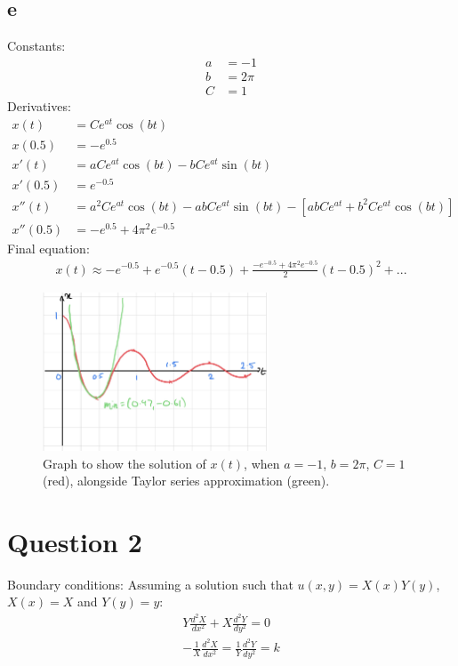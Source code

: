 \documentclass[11pt]{article}
\numberwithin{equation}{section}
\begin{document}
\subsection*{e}
Constants:
\begin{align}
  a &= - 1\\
  b &= 2\pi\\
  C &= 1
\end{align}
Derivatives:
\begin{align}
  x(t) &= Ce^{at}\cos{\left(bt\right)}\\
  x(0.5) &= -e^{0.5}\\
  x'(t) &= aC e^{at}\cos{\left(bt\right)} - bCe^{at}\sin{\left(bt\right)}\\
  x'(0.5) &= e^{-0.5}\\
  x''(t) &= a^2 C e^{at} \cos{\left(bt\right)} - abCe^{at}\sin{\left(bt\right)} - \left[ abCe^{at} + b^2 C e^{at}\cos{\left(bt\right)} \right]\\
  x''(0.5) &= -e^{0.5} + 4\pi^2e^{-0.5}
\end{align}
Final equation:
\begin{gather}
  x(t) \approx -e^{-0.5} + e^{-0.5}\left(t - 0.5\right) + \frac{-e^{-0.5}+ 4\pi^2e^{-0.5}}{2} \left(t-0.5\right)^2 + ...
\end{gather}
\begin{figure}[H]
  \centerline{\includegraphics[width = 0.6\textwidth]{q1e.png}}
  \caption{Graph to show the solution of $x(t)$, when $a = -1$, $b = 2\pi$, $C=1$ (red), alongside Taylor series approximation (green).}
\end{figure}
\section{Question 2}
Boundary conditions:
Assuming a solution such that $u(x, y) = X(x)Y(y)$, $X(x) = X$ and $Y(y) = y$:
\begin{gather}
  Y \frac{d^2X}{dx^2} + X\frac{d^2 Y}{dy^2} = 0\\
  -\frac{1}{X}\frac{d^2X}{dx^2} = \frac{1}{Y}\frac{d^2 Y}{dy^2} = k
\end{gather}
\end{document}
